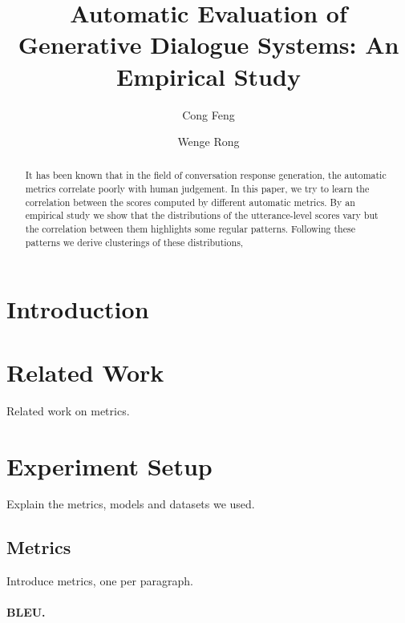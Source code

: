 \documentclass[runningheads]{llncs}
\begin{document}
\title{Automatic Evaluation of Generative Dialogue Systems: An Empirical Study}


\author{Cong Feng \and Wenge Rong}



\maketitle

\begin{abstract}
    It has been known that in the field of conversation response generation, the automatic metrics correlate poorly with human judgement.
    In this paper, we try to learn the correlation between the scores computed by different automatic metrics.
    By an empirical study we show that the distributions of the utterance-level scores vary but the correlation between them highlights some regular patterns.
    Following these patterns we derive clusterings of these distributions,
\end{abstract}


\section{Introduction}

\section{Related Work}
Related work on metrics.

\section{Experiment Setup}
Explain the metrics, models and datasets we used.

\subsection{Metrics}
Introduce metrics, one per paragraph.
\paragraph{BLEU.}
\end{document}
